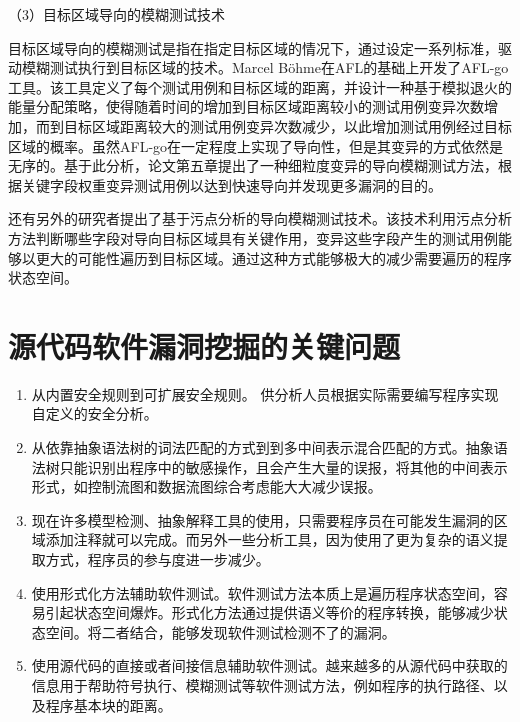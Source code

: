 （3）目标区域导向的模糊测试技术

目标区域导向的模糊测试是指在指定目标区域的情况下，通过设定一系列标准，驱动模糊测试执行到目标区域的技术。Marcel Böhme在AFL的基础上开发了AFL-go工具。该工具定义了每个测试用例和目标区域的距离，并设计一种基于模拟退火的能量分配策略，使得随着时间的增加到目标区域距离较小的测试用例变异次数增加，而到目标区域距离较大的测试用例变异次数减少，以此增加测试用例经过目标区域的概率。虽然AFL-go在一定程度上实现了导向性，但是其变异的方式依然是无序的。基于此分析，论文第五章提出了一种细粒度变异的导向模糊测试方法，根据关键字段权重变异测试用例以达到快速导向并发现更多漏洞的目的。

还有另外的研究者提出了基于污点分析的导向模糊测试技术。该技术利用污点分析方法判断哪些字段对导向目标区域具有关键作用，变异这些字段产生的测试用例能够以更大的可能性遍历到目标区域。通过这种方式能够极大的减少需要遍历的程序状态空间。


\section{源代码软件漏洞挖掘的关键问题}

\begin{enumerate}[(1)]
\item 从内置安全规则到可扩展安全规则。
供分析人员根据实际需要编写程序实现自定义的安全分析。
\item 从依靠抽象语法树的词法匹配的方式到到多中间表示混合匹配的方式。抽象语法树只能识别出程序中的敏感操作，且会产生大量的误报，将其他的中间表示形式，如控制流图和数据流图综合考虑能大大减少误报。
\item 现在许多模型检测、抽象解释工具的使用，只需要程序员在可能发生漏洞的区域添加注释就可以完成。而另外一些分析工具，因为使用了更为复杂的语义提取方式，程序员的参与度进一步减少。
\item 使用形式化方法辅助软件测试。软件测试方法本质上是遍历程序状态空间，容易引起状态空间爆炸。形式化方法通过提供语义等价的程序转换，能够减少状态空间。将二者结合，能够发现软件测试检测不了的漏洞。
\item 使用源代码的直接或者间接信息辅助软件测试。越来越多的从源代码中获取的信息用于帮助符号执行、模糊测试等软件测试方法，例如程序的执行路径、以及程序基本块的距离。
\end{enumerate}

